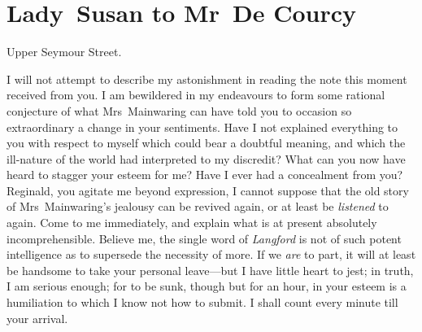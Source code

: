 \chapter{Lady~Susan to Mr~De Courcy}
  
  \begin{mail}{Upper Seymour Street.}{}

I will not attempt to describe my astonishment in reading the note this moment received from you. I am bewildered in my endeavours to form some rational conjecture of what Mrs~Mainwaring can have told you to occasion so extraordinary a change in your sentiments. Have I not explained everything to you with respect to myself which could bear a doubtful meaning, and which the ill-nature of the world had interpreted to my discredit? What can you now have heard to stagger your esteem for me? Have I ever had a concealment from you? Reginald, you agitate me beyond expression, I cannot suppose that the old story of Mrs~Mainwaring's jealousy can be revived again, or at least be \textit{listened} to again. Come to me immediately, and explain what is at present absolutely incomprehensible. Believe me, the single word of \textit{Langford} is not of such potent intelligence as to supersede the necessity of more. If we \textit{are} to part, it will at least be handsome to take your personal leave—but I have little heart to jest; in truth, I am serious enough; for to be sunk, though but for an hour, in your esteem is a humiliation to which I know not how to submit. I shall count every minute till your arrival. 

\end{mail}